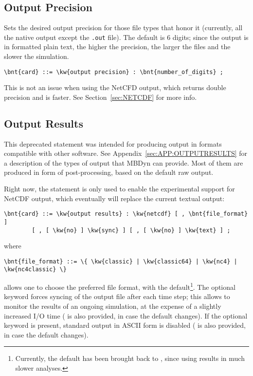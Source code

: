 \subsection{Output Precision}
Sets the desired output precision for those file types that honor it
(currently, all the native output except the \texttt{.out} file).
The default is 6 digits; since the output is in formatted plain text,
the higher the precision, the larger the files and the slower the simulation.
\begin{Verbatim}[commandchars=\\\{\}]
    \bnt{card} ::= \kw{output precision} : \bnt{number_of_digits} ;
\end{Verbatim}
This is not an issue when using the NetCFD output, which returns double
precision and is faster. See Section~\ref{sec:NETCDF} for more info.

\subsection{Output Results}\label{sec:CONTROLDATA:NETCDF}
This deprecated statement was intended for producing output in formats
compatible with other software.
See Appendix~\ref{sec:APP:OUTPUTRESULTS} for a description of the types
of output that MBDyn can provide.
Most of them are produced in form of post-processing, based on the default
raw output.

Right now, the  statement is only used to enable
the experimental support for NetCDF output, which eventually
will replace the current textual output:
\begin{Verbatim}[commandchars=\\\{\}]
    \bnt{card} ::= \kw{output results} : \kw{netcdf} [ , \bnt{file_format} ]
        [ , [ \kw{no} ] \kw{sync} ] [ , [ \kw{no} ] \kw{text} ] ;
\end{Verbatim}
where
\begin{Verbatim}[commandchars=\\\{\}]
    \bnt{file_format} ::= \{ \kw{classic} | \kw{classic64} | \kw{nc4} | \kw{nc4classic} \}
\end{Verbatim}
allows one to choose the preferred file format, with  the default\footnote{%
Currently, the default has been brought back to , since using  results in much slower analyses.
}.
The optional  keyword forces syncing of the
output file after each time step; this allows to monitor the results of an ongoing simulation, 
at the expense of a slightly increased I/O time ( is also provided, in case the default changes).
If the optional keyword  is present,
standard output in ASCII form is disabled ( is also provided, in case the default changes).


